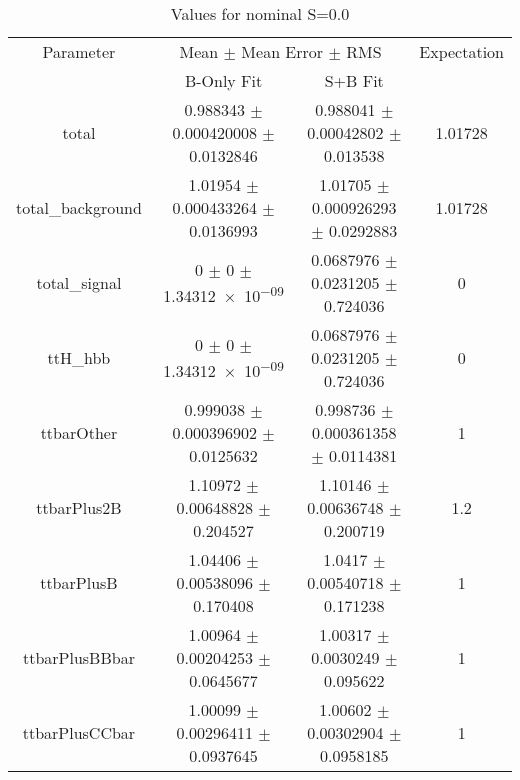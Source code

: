 \begin{table}
\centering
\caption{Values for nominal S=0.0}
\begin{tabular}{cccc}
\toprule
Parameter & \multicolumn{2}{c}{Mean $\pm$ Mean Error $\pm$ RMS} & Expectation\\
 & B-Only Fit & S+B Fit & \\
\midrule
total & \num{0.988343} $\pm$ \num{0.000420008} $\pm$ \num{0.0132846} & \num{0.988041} $\pm$ \num{0.00042802} $\pm$ \num{0.013538} & \num{1.01728}\\
total\_background & \num{1.01954} $\pm$ \num{0.000433264} $\pm$ \num{0.0136993} & \num{1.01705} $\pm$ \num{0.000926293} $\pm$ \num{0.0292883} & \num{1.01728}\\
total\_signal & \num{0} $\pm$ \num{0} $\pm$ \num{1.34312e-09} & \num{0.0687976} $\pm$ \num{0.0231205} $\pm$ \num{0.724036} & \num{0}\\
ttH\_hbb & \num{0} $\pm$ \num{0} $\pm$ \num{1.34312e-09} & \num{0.0687976} $\pm$ \num{0.0231205} $\pm$ \num{0.724036} & \num{0}\\
ttbarOther & \num{0.999038} $\pm$ \num{0.000396902} $\pm$ \num{0.0125632} & \num{0.998736} $\pm$ \num{0.000361358} $\pm$ \num{0.0114381} & \num{1}\\
ttbarPlus2B & \num{1.10972} $\pm$ \num{0.00648828} $\pm$ \num{0.204527} & \num{1.10146} $\pm$ \num{0.00636748} $\pm$ \num{0.200719} & \num{1.2}\\
ttbarPlusB & \num{1.04406} $\pm$ \num{0.00538096} $\pm$ \num{0.170408} & \num{1.0417} $\pm$ \num{0.00540718} $\pm$ \num{0.171238} & \num{1}\\
ttbarPlusBBbar & \num{1.00964} $\pm$ \num{0.00204253} $\pm$ \num{0.0645677} & \num{1.00317} $\pm$ \num{0.0030249} $\pm$ \num{0.095622} & \num{1}\\
ttbarPlusCCbar & \num{1.00099} $\pm$ \num{0.00296411} $\pm$ \num{0.0937645} & \num{1.00602} $\pm$ \num{0.00302904} $\pm$ \num{0.0958185} & \num{1}\\
\bottomrule
\end{tabular}
\end{table}